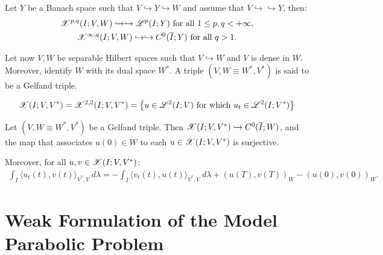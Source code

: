 \begin{theorem}
    Let $Y$ be a Banach space such that $V \hookrightarrow Y \hookrightarrow W$ and assume that $V \hookrightarrow \hookrightarrow Y$, then:
    \begin{gather}
        \mathscr{X}^{p, q}(I; V, W) \hookrightarrow \hookrightarrow \mathscr{L}^{p}(I; Y) \text{ for all } 1 \leq p, q < +\infty,\\
        \mathscr{X}^{\infty, q}(I; V, W) \hookrightarrow \hookrightarrow C^0(\overline{I}; Y) \text{ for all } q > 1.
    \end{gather}
\end{theorem}

\begin{definition} \label{definition:gelfand}
    Let now $V, W$ be separable Hilbert spaces such that $V \hookrightarrow W$ and $V$ is dense in $W$. Moreover, identify $W$ with its dual space $W^*$. A triple $\left( V, W \equiv W^*, V^* \right)$ is said to be a Gelfand triple.
\end{definition}

\begin{definition}[$\X(I; V, V^*)$] \label{definition:x}
    \begin{gather}
        \mathscr{X}(I; V, V^*) = \mathscr{X}^{2, 2}(I; V, V^*) = \left\{ u \in \mathscr{L}^{2}(I; V) \text{ for which } u_t \in \mathscr{L}^{2}(I; V^*) \right\}
    \end{gather}
\end{definition}

\begin{theorem}
    Let $\left( V, W \equiv W^*, V^* \right)$ be a Gelfand triple. Then $\mathscr{X}(I; V, V^*) \hookrightarrow C^0(\overline{I};W)$, and the map that associates $u(0) \in W$ to each $u \in \mathscr{X}(I; V, V^*)$ is surjective.

    Moreover, for all $u, v \in \mathscr{X}(I; V, V^*)$:
    \begin{gather}
        \int_I \langle u_t(t), v(t) \rangle_{V^*, V} ~ d \lambda = - \int_I \langle v_t(t), u(t) \rangle_{V^*, V} ~ d \lambda + \left( u(T), v(T) \right)_W - \left( u(0), v(0) \right)_W.
    \end{gather}
\end{theorem}

\newpage
\section{Weak Formulation of the Model Parabolic Problem}

